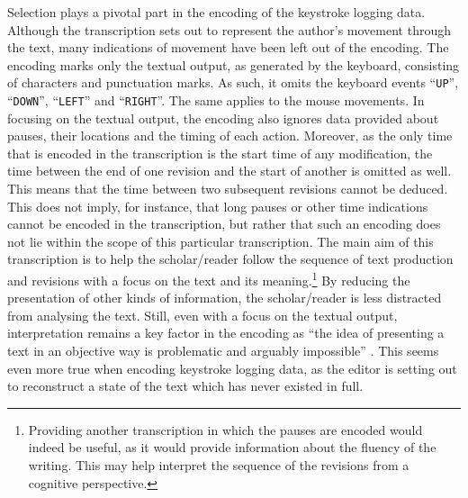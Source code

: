 \begin{paper}
Selection plays a pivotal part in the encoding of the keystroke logging
data. Although the transcription sets out to represent the author's
movement through the text, many indications of movement have been left
out of the encoding. The encoding marks only the textual output, as
generated by the keyboard, consisting of characters and punctuation
marks. As such, it omits the keyboard events ``\verb|UP|'', ``\verb|DOWN|'', ``\verb|LEFT|'' and ``\verb|RIGHT|''. The same applies to the mouse movements. In focusing on the
textual output, the encoding also ignores data provided about pauses,
their locations and the timing of each action. Moreover, as the only
time that is encoded in the transcription is the start time of any
modification, the time between the end of one revision and the start of
another is omitted as well. This means that the time between two
subsequent revisions cannot be deduced. This does not imply, for
instance, that long pauses or other time indications cannot be encoded
in the transcription, but rather that such an encoding does not lie
within the scope of this particular transcription. The main aim of this
transcription is to help the scholar/reader follow the sequence of text
production and revisions with a focus on the text and its
meaning.\footnote{Providing another transcription in which the pauses
  are encoded would indeed be useful, as it would provide information
  about the fluency of the writing. This may help interpret the sequence
  of the revisions from a cognitive perspective.} By reducing the
presentation of other kinds of information, the scholar/reader is less
distracted from analysing the text. Still, even with a focus on the
textual output, interpretation remains a key factor in the encoding as
``the idea of presenting a text in an objective way is problematic and
arguably impossible'' 
\citep[114]{bleeker_future_2015}. This seems even more true
when encoding keystroke logging data, as the editor is setting out to
reconstruct a state of the text which has never existed in full.


\end{paper}

